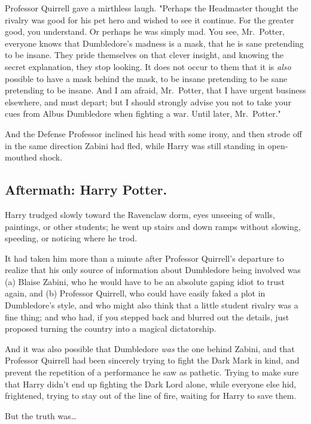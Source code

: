 Professor Quirrell gave a mirthless laugh. "Perhaps the Headmaster thought the 
rivalry was good for his pet hero and wished to see it continue. For the 
greater good, you understand. Or perhaps he was simply mad. You see, 
Mr.~Potter, everyone knows that Dumbledore's madness is a mask, that he is sane 
pretending to be insane. They pride themselves on that clever insight, and 
knowing the secret explanation, they stop looking. It does not occur to them 
that it is \emph{also} possible to have a mask behind the mask, to be insane 
pretending to be sane pretending to be insane. And I am afraid, Mr.~Potter, 
that I have urgent business elsewhere, and must depart; but I should strongly 
advise you not to take your cues from Albus Dumbledore when fighting a war. 
Until later, Mr.~Potter."

And the Defense Professor inclined his head with some irony, and then strode 
off in the same direction Zabini had fled, while Harry was still standing in 
open-mouthed shock.
\sbreak
\vspace{-2\baselineskip}
\subsection{Aftermath: Harry Potter.}

Harry trudged slowly toward the Ravenclaw dorm, eyes unseeing of walls, 
paintings, or other students; he went up stairs and down ramps without slowing, 
speeding, or noticing where he trod.

It had taken him more than a minute after Professor Quirrell's departure to 
realize that his only source of information about Dumbledore being involved was 
(a) Blaise Zabini, who he would have to be an absolute gaping idiot to trust 
again, and (b) Professor Quirrell, who could have easily faked a plot in 
Dumbledore's style, and who might also think that a little student rivalry was 
a fine thing; and who had, if you stepped back and blurred out the details, 
just proposed turning the country into a magical dictatorship.

And it was also possible that Dumbledore \emph{was} the one behind Zabini, and 
that Professor Quirrell had been sincerely trying to fight the Dark Mark in 
kind, and prevent the repetition of a performance he saw as pathetic. Trying to 
make sure that Harry didn't end up fighting the Dark Lord alone, while everyone 
else hid, frightened, trying to stay out of the line of fire, waiting for Harry 
to save them.

But the truth was{\ldots}

